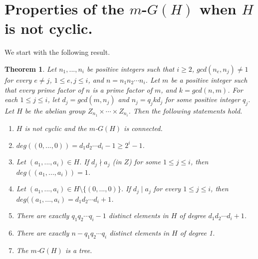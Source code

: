 \documentclass{amsart}
\newtheorem{thm}{Theorem}[section]
\theoremstyle{plain}
\begin{document}
\section{Properties of the $m$-$G(H)$ when $H$ is not cyclic.}


We start with the following result.


\begin{thm}\label{T5}
	Let $n_1, ..., n_i$  be positive integers such that $i \geq 2$,  $gcd(n_e, n_j) \not = 1$ for every $e \not = j$, $1 \leq e, j \leq i$, and $n = n_1n_2 \cdots n_i$. Let $m$ be a positive integer such that every prime factor of $n$ is a prime factor of $m$, and $k = gcd(n, m)$. For each $1 \leq j \leq i$, let $d_j = gcd(m, n_j)$ and $n_j = q_jkd_j$ for some positive integer $q_j$. Let $H$ be the abelian group $Z_{n_1}  \times \cdots \times Z_{n_i}$. Then the following statements hold.
	\begin{enumerate}
		\item  $H$ is not cyclic and the $m$-$G(H)$ is connected.
		\item $deg((0, ..., 0)) = d_1d_2\cdots d_i  - 1 \geq 2^i -1$.
		\item Let $(a_1, ..., a_i) \in H$. If $d_j \nmid a_j$ (in $Z$) for some $1 \leq j \leq i$, then $deg((a_1, ..., a_i)) = 1$.
		\item Let $(a_1, ..., a_i) \in H \setminus \{ (0, ..., 0)\}$. If $d_j \mid a_j$ for every $1 \leq j \leq i$, then $deg((a_1, ... , a_i) = d_1d_2 \cdots d_i + 1$.
		\item There are exactly $q_1q_2 \cdots q_i - 1$ distinct elements in $H$ of degree $d_1d_2 \cdots d_i + 1$.
		\item There are exactly $n - q_1q_2 \cdots q_i$ distinct elements in $H$ of degree 1.
		\item The $m$-$G(H)$ is a tree.
	\end{enumerate}
\end{thm}
\end{document}
